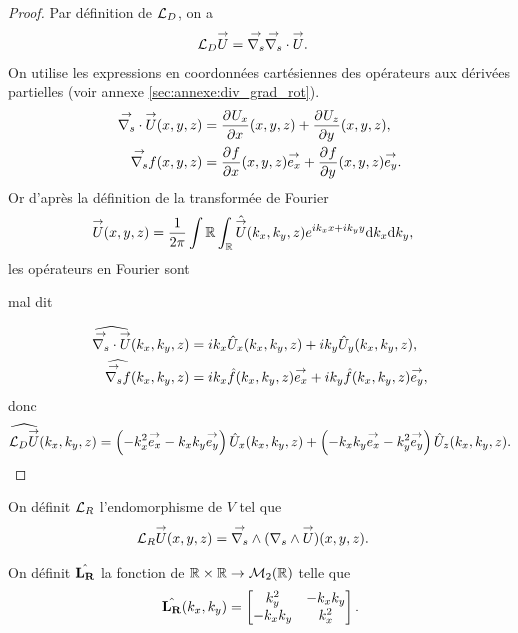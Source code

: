     \begin{proof}
      Par définition de \(\LD\), on a
      \begin{align*}
        \LD \vect{U} & = \vgrads{} \vdivs{} \vect{U}.
      \end{align*}
      On utilise les expressions en coordonnées cartésiennes des opérateurs aux dérivées partielles (voir annexe \ref{sec:annexe:div_grad_rot}).
      \begin{align*}
        \vdivs{\vect{U}}(x,y,z) &= \ddr{x}{U_x}(x,y,z) + \ddr{y}{U_z}(x,y,z),
        \\
        \vgrads{f}(x,y,z) &= \ddr{x}{f}(x,y,z)\vect{e_x} + \ddr{y}{f}(x,y,z)\vect{e_y}.
      \end{align*}
      Or d’après la définition de la transformée de Fourier
      \begin{align*}
        \vect{U}(x,y,z) & = \frac{1}{2\pi} \int\RR \int_\RR \hat{\vect{U}}(k_x,k_y,z)e^{ik_xx + ik_yy}\dd{k_x}\dd{k_y},
      \end{align*}
      les opérateurs en Fourier sont
      \begin{REM}
        mal dit
      \end{REM}
      \begin{align*}
        \widehat{\vdivs{\vect{U}}}(k_x,k_y,z) &= ik_x{\hat{U}_x}(k_x,k_y,z) + ik_y{\hat{U}_y}(k_x,k_y,z),
        \\
        \widehat{\vgrads{f}}(k_x,k_y,z) &= ik_x\hat{f}(k_x,k_y,z)\vect{e_x} + ik_y\hat{f}(k_x,k_y,z)\vect{e_y},
      \end{align*}
      donc
      \begin{align*}
        \widehat{\LD{\vect{U}}}(k_x,k_y,z) =  \left(-k_x^2\vect{e_x} -k_xk_y\vect{e_y}\right){\hat{U}_x}(k_x,k_y,z) + \left(-k_xk_y\vect{e_x} - {k_y^2}\vect{e_y}\right){\hat{U}_z}(k_x,k_y,z).
      \end{align*}

    \end{proof}


    \begin{defn}
      \label{eq:plan:fourier:LR}

      On définit \(\LR\) l'endomorphisme de \(V\) tel que
      \begin{align*}
        \LR \vect{U}(x,y,z) & = \vrots{} (\rots{} \vect{U})(x,y,z).
      \end{align*}

      On définit \(\hat{\mLR}\) la fonction de \(\RR\times\RR \rightarrow \mathcal{M}_2(\RR)\) telle que
      \begin{equation*}
        \hat{\mLR}(k_x,k_y) = 
        \begin{bmatrix}
          k_y^2 & -k_xk_y
          \\
          -k_xk_y & k_x^2
        \end{bmatrix}.
      \end{equation*}
    \end{defn}

